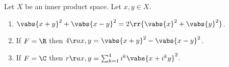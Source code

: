 \documentclass{article}
\begin{document}
\begin{theorem}
  Let $X$ be an inner product space. Let $x,y\in X$.
  \begin{enumerate}
    \item $\vabs{x+y}^2+\vabs{x-y}^2= 2\rr{\vabs{x}^2+\vabs{y}^2}$.
    \item If $F=\R$ then $4\aa{x,y}=\vabs{x+y}^2 - \vabs{x-y}^2$.
    \item If $F=\C$ then $r\aa{x,y}=\sum_{k=1}^4 i^k \vabs{x+i^ky}^2$.
  \end{enumerate}
\end{theorem}
\end{document}
